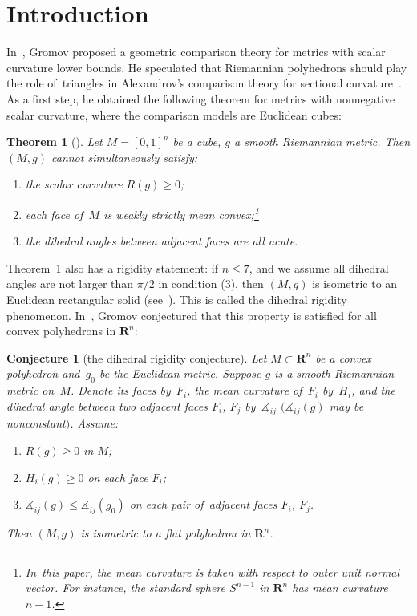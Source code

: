 \documentclass[pdftex]{sigma}
\numberwithin{equation}{section}
\newtheorem{theo}[prop]{Theorem}
\newtheorem{conj}[prop]{Conjecture}
\theoremstyle{definition}
\newcommand{\RR}{\mathbf{R}}
\begin{document}
\renewcommand{\thefootnote}{\arabic{footnote}}
\setcounter{footnote}{0}

\section{Introduction}
In~\cite{Gromov2014Dirac}, Gromov proposed a geometric comparison theory for metrics with scalar curvature lower bounds. He speculated that Riemannian polyhedrons should play the role of~triangles in Alexandrov's comparison theory for sectional curvature~\cite{AleksandrovRerestovskiiNikolaev86}. As a first step, he obtained the following theorem for metrics with nonnegative scalar curvature, where the comparison models are Euclidean cubes:

\begin{theo}[\cite{Gromov2014Dirac}]\label{theo.cube.nonrigit}
Let $M=[0,1]^n$ be a cube, $g$ a smooth Riemannian metric. Then $(M,g)$ cannot simultaneously satisfy:
\begin{enumerate}\itemsep=0pt
\item[${\rm 1)}$] the scalar curvature $R(g)\ge 0$;
\item[${\rm 2)}$] each face of~$M$ is weakly strictly mean convex;\footnote{In~this paper, the mean curvature is taken with respect to outer unit normal vector. For instance, the standard sphere $S^{n-1}$ in $\RR^n$ has mean curvature $n-1$.}
\item[${\rm 3)}$] the dihedral angles between adjacent faces are all acute.
\end{enumerate}
\end{theo}

Theorem~\ref{theo.cube.nonrigit} also has a rigidity statement: if $n\le 7$, and we assume all dihedral angles are not larger than $\pi/2$ in condition (3), then $(M,g)$ is isometric to an Euclidean rectangular solid (see~\cite{Li2017polyhedron,li2019dihedral}). This is called the dihedral rigidity phenomenon. In~\cite{Gromov2014Dirac,Gromov2018Adozen}, Gromov conjectured that this property is satisfied for all convex polyhedrons in $\RR^n$:

\begin{conj}[the dihedral rigidity conjecture]\label{conj.dihedral.rigidity}
Let $M\subset \RR^n$ be a convex polyhedron and~$g_0$ be the Euclidean metric. Suppose $g$ is a smooth Riemannian metric on~$M$. Denote its faces by~$F_i$, the mean curvature of~$F_i$ by~$H_i$, and the dihedral angle between two adjacent faces $F_i$, $F_j$ by~$\measuredangle_{ij}$ $(\measuredangle_{ij}(g)$ may be nonconstant$)$. Assume:
\begin{enumerate}\itemsep=0pt
\item[${\rm 1)}$] $R(g)\ge 0$ in $M$;
\item[${\rm 2)}$] $H_i(g)\ge 0$ on each face $F_i$;
 \item[${\rm 3)}$] $\measuredangle_{ij}(g)\le \measuredangle_{ij}(g_0)$ on each pair of~adjacent faces $F_i$, $F_j$.
\end{enumerate}
Then $(M,g)$ is isometric to a flat polyhedron in $\RR^n$.
\end{conj}
\end{document}
